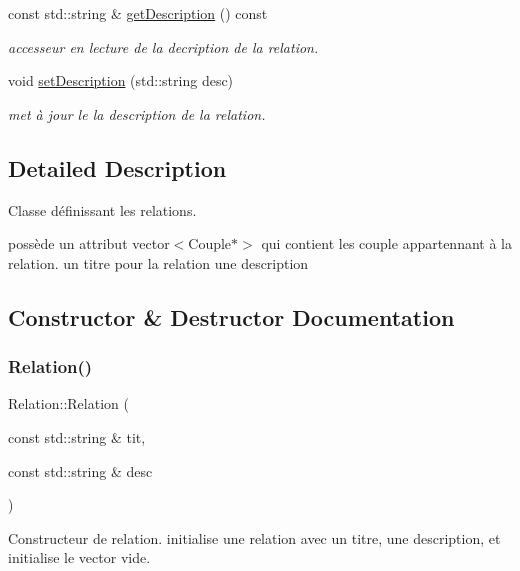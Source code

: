 \begin{DoxyCompactItemize}
\mbox{\label{class_relation_a3d43bd45798051dc3aa6015aa225a7c0}} 
const std\+::string \& \hyperlink{class_relation_a3d43bd45798051dc3aa6015aa225a7c0}{get\+Description} () const
\begin{DoxyCompactList}\small\item\em accesseur en lecture de la decription de la relation. \end{DoxyCompactList}\item 
void \hyperlink{class_relation_a481de051dc44065bb816b9b94b5d0c48}{set\+Description} (std\+::string desc)
\begin{DoxyCompactList}\small\item\em met à jour le la description de la relation. \end{DoxyCompactList}\end{DoxyCompactItemize}


\subsection{Detailed Description}
Classe définissant les relations. 

possède un attribut vector$<$\+Couple$\ast$$>$ qui contient les couple appartennant à la relation. un titre pour la relation une description 

\subsection{Constructor \& Destructor Documentation}
\mbox{\label{class_relation_ad80d3956dac01f647bdbb740fdd1cf73}} 
\subsubsection{\texorpdfstring{Relation()}{Relation()}}
{\footnotesize\ttfamily Relation\+::\+Relation (\begin{DoxyParamCaption}\item[{const std\+::string \&}]{tit,  }\item[{const std\+::string \&}]{desc }\end{DoxyParamCaption})\hspace{0.3cm}{\ttfamily [inline]}}



Constructeur de relation. initialise une relation avec un titre, une description, et initialise le vector vide. 



